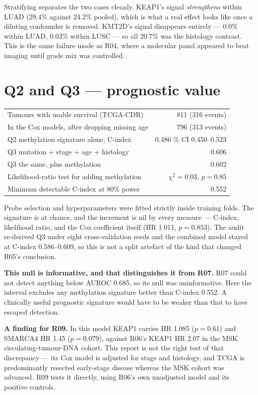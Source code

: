 \documentclass[11pt,a4paper]{article}
\begin{document}
Stratifying separates the two cases cleanly. KEAP1's signal \emph{strengthens} within LUAD
(29.4\% against 24.2\% pooled), which is what a real effect looks like once a diluting
confounder is removed. KMT2D's signal disappears entirely --- 0.0\% within LUAD, 0.03\% within
LUSC --- so all 20.7\% was the histology contrast. This is the same failure mode as R04, where
a molecular panel appeared to beat imaging until grade mix was controlled.

\section{Q2 and Q3 --- prognostic value}

\begin{center}
\begin{tabular}{@{}lr@{}}
\toprule
Tumours with usable survival (TCGA-CDR) & 811 (316 events) \\
In the Cox models, after dropping missing age & 796 (313 events) \\
\midrule
Q2 methylation signature alone, C-index & 0.486 \quad 95\% CI 0.450--0.523 \\
Q3 mutation + stage + age + histology & 0.606 \\
Q3 the same, plus methylation & 0.602 \\
Likelihood-ratio test for adding methylation & $\chi^2 = 0.03$, $p = 0.85$ \\
Minimum detectable C-index at 80\% power & 0.552 \\
\bottomrule
\end{tabular}
\end{center}

Probe selection and hyperparameters were fitted strictly inside training folds. The signature
is at chance, and the increment is nil by every measure --- C-index, likelihood ratio, and the
Cox coefficient itself (HR 1.011, $p = 0.853$). The audit re-derived Q3 under eight
cross-validation seeds and the combined model stayed at C-index 0.586--0.609, so this is not a
split artefact of the kind that changed R05's conclusion.

\textbf{This null is informative, and that distinguishes it from R07.} R07 could not detect
anything below AUROC 0.685, so its null was uninformative. Here the interval excludes any
methylation signature better than C-index 0.552. A clinically useful prognostic signature would
have to be weaker than that to have escaped detection.

\textbf{A finding for R09.} In this model KEAP1 carries HR 1.085 ($p = 0.61$) and SMARCA4
HR 1.45 ($p = 0.079$), against R06's KEAP1 HR 2.07 in the MSK circulating-tumour-DNA cohort.
This report is not the right test of that discrepancy --- its Cox model is adjusted for stage
and histology, and TCGA is predominantly resected early-stage disease whereas the MSK cohort
was advanced. R09 tests it directly, using R06's own unadjusted model and its positive controls.
\end{document}
